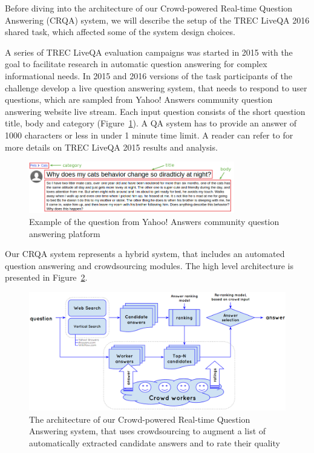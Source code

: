Before diving into the architecture of our Crowd-powered Real-time Question Answering (CRQA) system, we will describe the setup of the TREC LiveQA 2016 shared task, which affected some of the system design choices.

A series of TREC LiveQA evaluation campaigns was started in 2015 with the goal to facilitate research in automatic question answering for complex informational needs.
In 2015 and 2016 versions of the task participants of the challenge develop a live question answering system, that needs to respond to user questions, which are sampled from Yahoo! Answers community question answering website live stream.
Each input question consists of the short question title, body and category (Figure~\ref{fig:ya_question}).
A QA system has to provide an answer of 1000 characters or less in under 1 minute time limit.
A reader can refer to \cite{agichtein2015overview} for more details on TREC LiveQA 2015 results and analysis.

\begin{figure}[h!t]
	\centering
	\includegraphics[width=0.8\textwidth]{img/ya_question}
	\caption{Example of the question from Yahoo! Answers community question answering platform}
	\label{fig:ya_question}
\end{figure}

Our CRQA system represents a hybrid system, that includes an automated question answering and crowdsourcing modules.
The high level architecture is presented in Figure~\ref{fig:system}.

\begin{figure}[h!t]
	\centering
	\includegraphics[width=\textwidth]{img/system}
	\caption{The architecture of our Crowd-powered Real-time Question Answering system, that uses crowdsourcing to augment a list of automatically extracted candidate answers and to rate their quality}
	\label{fig:system}
\end{figure}

